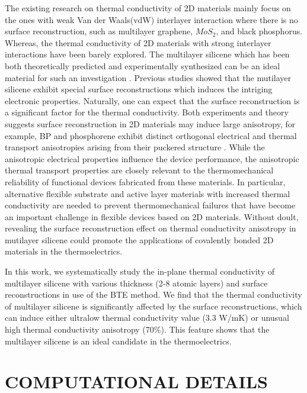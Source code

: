 \documentclass[aps,prb,twocolumn,showpacs,amsmath,amssymb]{revtex4-1}
\begin{document}
The existing research on thermal conductivity of  2D materials  mainly focus on the ones with weak Van der Waals(vdW) interlayer interaction where there is no surface reconstruction, such as multilayer graphene\cite{Lindsay2011,Ni2012,Wang2011}, $MoS_2$\cite{Liu2015}, and black phosphorus\cite{Zhang2015,Peng2015,Jain2015}.  Whereas, the thermal conductivity of 2D materials with strong interlayer interactions have been barely explored.
The multilayer silicene which has been both theoretically predicted and experimentally synthesized can be an ideal material for such an investigation \cite{Fu2014,Padova2016,Guo2015Structural}.
Previous studies  showed that the mutilayer silicene exhibit special surface reconstructions which induces the intriging electronic properties\cite{Fu2014,Guo2015Structural}. Naturally, one can expect that  the surface reconstruction is a significant factor for the thermal conductivity. Both experiments and theory suggests surface reconstruction in 2D materials may induce large anisotropy, for example, BP and phosphorene exhibit distinct orthogonal electrical and thermal transport anisotropies arising from their puckered structure \cite{Zhang2015,Peng2015}. While the anisotropic electrical properties influence the device performance, the anisotropic thermal transport properties are closely relevant to the thermomechanical reliability of functional devices fabricated from these materials. In particular, alternative flexible substrate and active layer materials with increased thermal conductivity are needed to prevent thermomechanical failures that have become an important challenge in flexible devices based on 2D materials\cite{Akinwande2014,Sadeghi2016}. Without doult, revealing the surface reconstruction effect on thermal conductivity anisotropy  in mutilayer silicene  could promote the applications of covalently bonded 2D materials in the thermoelectrics.

In this work, we systematically study the in-plane thermal conductivity of multilayer silicene with various thickness  (2-8 atomic layers) and surface reconstructions in use of  the BTE method.  We find that the thermal conductivity of multilayer silicene is significantly affected by the surface reconstructions, which can induce  either ultralow thermal conductivity value ($3.3$ W/mK) or unusual high thermal conductivity anisotropy (70\%).  This feature shows that the  multilayer silicene is an ideal candidate in the thermoelectrics.


\section{COMPUTATIONAL DETAILS}
\end{document}
